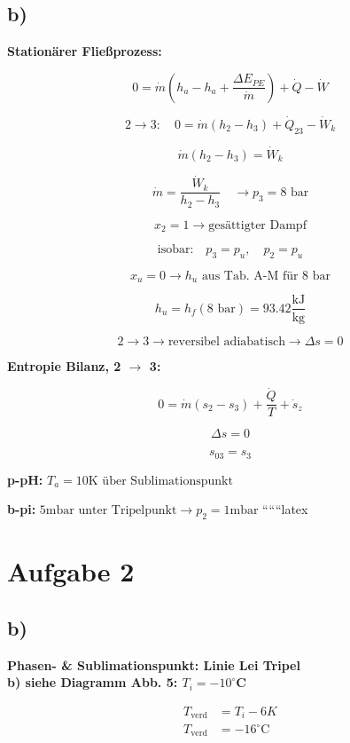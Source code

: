 

\subsection*{b)}

\textbf{Stationärer Fließprozess:}

\[
0 = \dot{m}(h_{a} - h_{a} + \frac{\Delta E_{PE}}{\dot{m}}) + \dot{Q} - \dot{W}
\]

\[
2 \rightarrow 3: \quad 0 = \dot{m}(h_{2} - h_{3}) + \dot{Q}_{23} - \dot{W}_{k}
\]

\[
\dot{m}(h_{2} - h_{3}) = \dot{W}_{k}
\]

\[
\dot{m} = \frac{\dot{W}_{k}}{h_{2} - h_{3}} \quad \rightarrow p_{3} = 8 \text{ bar}
\]

\[
x_{2} = 1 \rightarrow \text{gesättigter Dampf}
\]

\[
\text{isobar:} \quad p_{3} = p_{u}, \quad p_{2} = p_{u}
\]

\[
x_{u} = 0 \rightarrow h_{u} \text{ aus Tab. A-M für 8 bar}
\]

\[
h_{u} = h_{f}(8 \text{ bar}) = 93.42 \frac{\text{kJ}}{\text{kg}}
\]

\[
2 \rightarrow 3 \rightarrow \text{reversibel adiabatisch} \rightarrow \Delta s = 0
\]

\textbf{Entropie Bilanz, 2 $\rightarrow$ 3:}

\[
0 = \dot{m}(s_{2} - s_{3}) + \frac{\dot{Q}}{T} + \dot{s}_{z}
\]

\[
\Delta s = 0
\]

\[
s_{03} = s_{3}
\]

\textbf{p-pH:} $T_{a} = 10 \text{K über Sublimationspunkt}$

\textbf{b-pi:} $5 \text{mbar unter Tripelpunkt} \rightarrow p_{2} = 1 \text{mbar}$
``````latex


\section*{Aufgabe 2}



\subsection*{b)}
\textbf{Phasen- \& Sublimationspunkt: Linie Lei Tripel}\\
\textbf{b) siehe Diagramm Abb. 5: $T_i = -10^\circ$C}

\begin{align*}
T_{\text{verd}} &= T_i - 6K \\
T_{\text{verd}} &= -16^\circ\text{C}
\end{align*}

